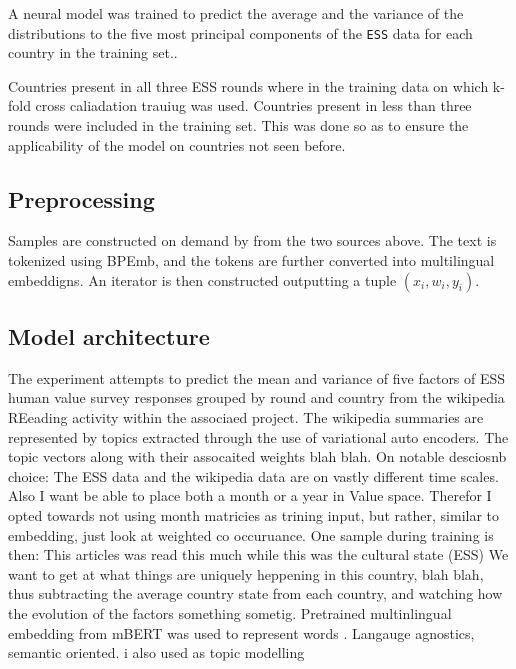 A neural model was trained to predict the average and the variance of the distributions to the five most principal components of the \texttt{ESS} data for each country in the training set..

Countries present in all three ESS rounds where in the training data on which k-fold cross caliadation trauiug was used.
Countries present in less than three rounds were included in the training set. This was done so as to
ensure the applicability of the model on countries not seen before.

\subsection*{Preprocessing}
Samples are constructed on demand by from the two sources above.
The text is tokenized using BPEmb, and the tokens are further converted into multilingual embeddigns.
An iterator is then constructed outputting a tuple $(x_i, w_i, y_i)$.

\subsection*{Model architecture}
The experiment attempts to predict the mean and variance of five factors of ESS human value survey responses grouped by round and country from the wikipedia REeading activity within the associaed project.
The wikipedia summaries are represented by topics extracted through the use of variational auto encoders. The topic vectors along with their assocaited weights blah blah.
On notable desciosnb choice: The ESS data and the wikipedia data are on vastly different time scales. Also I want be able to place both a month or a year in Value space. Therefor I opted towards not using month matricies as trining input, but rather, similar to embedding, just look at weighted co occuruance. One sample during training is then: This articles was read this much while this was the cultural state (ESS)
We want to get at what things are uniquely heppening in this country, blah blah, thus subtracting the average country state from each country, and watching how the evolution of the factors something sometig.
Pretrained multinlingual embedding from mBERT was used to represent words \cite{artetxe-etal-2017-learning}. Langauge agnostics, semantic oriented.
\cite{kingma2013auto} i also used as topic modelling
\cite{DBLP:journals/corr/abs-1810-04805}
\cite{Wu2020}

